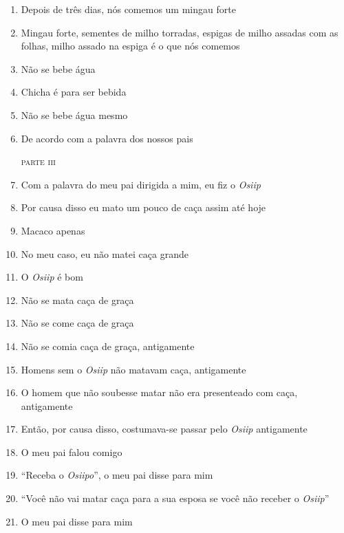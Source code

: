 \begin{enumerate}
 \item Depois de três dias, nós comemos um mingau forte
 \item Mingau forte, sementes de milho torradas, espigas de milho assadas
 com as folhas, milho assado na espiga é o que nós comemos
 \item Não se bebe água
 \item Chicha é para ser bebida
 \item Não se bebe água mesmo
 \item De acordo com a palavra dos nossos pais
 
 \begin{flushright}\textsc{parte iii}\end{flushright}
 
 \item Com a palavra do meu pai dirigida a mim, eu fiz o \textit{Osiip}
 \item Por causa disso eu mato um pouco de caça assim até hoje
 \item Macaco apenas
 \item No meu caso, eu não matei caça grande
 
 \begin{center}\end{center}
 
 \item O \textit{Osiip} é bom
 \item Não se mata caça de graça
 \item Não se come caça de graça
 \item Não se comia caça de graça, antigamente
 \item Homens sem o \textit{Osiip} não matavam caça, antigamente
 \item O homem que não soubesse matar não era presenteado com caça,
 antigamente
 \item Então, por causa disso, costumava-se passar pelo \textit{Osiip}
 antigamente
 
 \begin{center}\end{center}
 
 \item O meu pai falou comigo
 \item ``Receba o \textit{Osiipo}'', o meu pai disse para mim
 \item ``Você não vai matar caça para a sua esposa se você não receber o
 \textit{Osiip}''
 \item O meu pai disse para mim
 

\end{enumerate}
